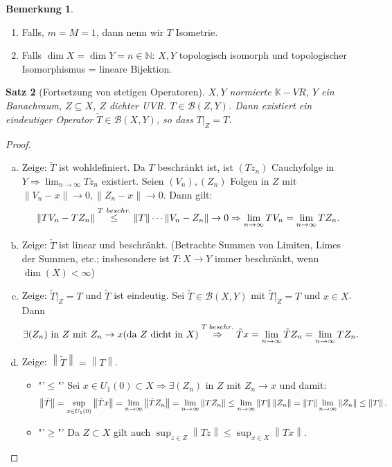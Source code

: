 \documentclass[ngerman]{report}
\theoremstyle{plain}%
\newtheorem{thm}{Satz}[chapter]
\theoremstyle{definition}%
\theoremstyle{myStyle}
\newtheorem{bem}[thm]{Bemerkung}
\newcommand{\N}{\mathbb{N}}
\newcommand{\K}{\mathbb{K}}
\newcommand{\B}{\mathcal{B}} %
\newcommand{\BS}[1][X,Y]{\mathcal{B}(#1)} %
\newcommand{\norm}[1]{\left \|#1\right\| }
\newcommand{\df}[1][]{%
	\overset{#1}{\Rightarrow}
}
\newcommand{\limes}[1][\infty]{\lim_{n \to #1}}
\newcommand{\disp}{\displaystyle}
\newcommand{\qmarks}[1]{#1}
\newcommand{\spcm}[1][-0.8]{\vspace{#1 em}} %
\begin{document}
	\begin{bem}
		\begin{enumerate}
			\item Falls, $m=M=1$, dann nenn wir $T$ \qmarks{Isometrie}.
			\item Falls $\dim X = \dim Y = n\in \N$: $X,Y$ topologisch isomorph und topologischer Isomorphismus = lineare Bijektion.
		\end{enumerate}
	\end{bem}
	\begin{thm}[Fortsetzung von stetigen Operatoren]
		$X,Y$ normierte $\K-VR$, $Y$ ein Banachraum, $Z\subseteq X$, $Z$ dichter UVR.
		$T\in \B(Z,Y)$. Dann existiert ein eindeutiger Operator $\tilde{T} \in \BS$, so dass
		$T|_Z = T$.
	\end{thm}

	\begin{proof}
		\begin{enumerate}[a)]
			\item Zeige: $\tilde{T}$ ist wohldefiniert. Da $T$ beschränkt ist, ist $(Tz_n)$ Cauchyfolge in $Y \df \disp \limes  Tz_n$ existiert.
			Seien $(V_n), (Z_n)$ Folgen in $Z$ mit $\norm{V_n-x} \to 0, \norm{Z_n-x} \to 0.$ Dann gilt:
			 \vspace{-0.8em}$$ \norm{TV_n - TZ_n} \overset{T~beschr.}{\leq} \norm{T}\cdots \norm{V_n - Z_n} \to 0 \df \limes TV_n = \limes TZ_n.\vspace{-0.8em}$$
			\item Zeige: $\tilde{T}$ ist linear und beschränkt. (Betrachte Summen von Limiten, Limes der Summen, etc.; insbesondere ist $T:X \to Y$ immer beschränkt, wenn $\dim(X)<\infty$)
			\item Zeige: $\tilde{T}|_Z = T$ und $\tilde{T}$ ist eindeutig.
			Sei $\tilde{T} \in \B(X,Y)$ mit $\tilde{T}|_Z = T$ und $x \in X$. Dann 
				\spcm $$\exists (Z_n) \text{ in } Z \text{ mit } Z_n \to x (\text{da } Z \text{ dicht in } X) \overset{T\;beschr.}{\df} \tilde{T}x=\limes \tilde{T}Z_n = \limes TZ_n.\spcm$$
			\item Zeige: $\norm{\tilde{T}}=\norm{T}$.
			\begin{itemize}[]
				\item "'\;$\leq$\;"' Sei $x \in U_1(0)\subset X \df \exists (Z_n)$ in $Z$ mit $Z_n \to x$ und damit:
				\spcm[-0.75em] \[\norm{\tilde{T}} = \sup_{x \in U_1(0)}\norm{\tilde{T}x} = \limes \norm{\tilde{T}Z_n} = \limes \norm{TZ_n} \leq \limes \norm{T} \norm{Z_n} = \norm{T}\limes \norm{Z_n} \leq \norm{T}.\spcm \] 
				\item "'\;$\geq$\;"' Da $Z\subset X$ gilt auch $\disp \sup_{z \in Z} \norm{Tz} \leq \sup_{x \in X} \norm{Tx}$.
			\end{itemize}
		\end{enumerate}
	\end{proof}
\end{document}

